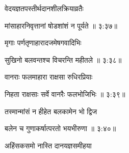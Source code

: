 {\devanagarifont वेदयज्ञतपस्तीर्थदानशीलक्रियाव्रतैः \thinspace{\dandab} \dontdisplaylinenum }%


{\devanagarifont मांसाहारनिवृत्तानां षोडशांशं न पूर्यते {॥ ३:३७॥} \veg\dontdisplaylinenum }%

{\devanagarifont मृगाः पर्णतृणाहारादजमेषगवादिभिः \thinspace{\dandab} \dontdisplaylinenum }%


{\devanagarifont सुखिनो बलवन्तश्च विचरन्ति महीतले {॥ ३:३८॥} \veg\dontdisplaylinenum }%
 
{\devanagarifont वानराः फलमाहारा राक्षसा रुधिरप्रियाः \thinspace{\dandab} \dontdisplaylinenum }%


{\devanagarifont निहता राक्षसाः सर्वे वानरैः फलभोजिभिः {॥ ३:३९॥} \veg\dontdisplaylinenum }%

{\devanagarifont तस्मान्मांसं न हीहेत बलकामेन भो द्विज \thinspace{\dandab} \dontdisplaylinenum }%


{\devanagarifont बलेन च गुणाकर्षात्परतो भयभीरुणा {॥ ३:४०॥} \veg\dontdisplaylinenum }%

{\devanagarifont अहिंसकसमो नास्ति दानयज्ञसमीहया \thinspace{\dandab} \dontdisplaylinenum }%

